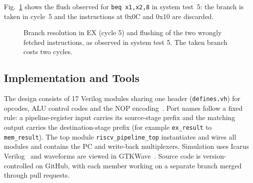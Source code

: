 Fig.~\ref{fig:flush} shows the flush observed for \texttt{beq x1,x2,8} in system test~5:
the branch is taken in cycle~5 and the instructions at 0x0C and 0x10 are discarded.

\begin{figure}[!t]
\centering
{}
\caption{Branch resolution in EX (cycle 5) and flushing of the two wrongly fetched
instructions, as observed in system test 5. The taken branch costs two cycles.}
\label{fig:flush}
\end{figure}

\subsection{Implementation and Tools}
The design consists of 17 Verilog modules sharing one header (\texttt{defines.vh}) for
opcodes, ALU control codes and the NOP encoding~\cite{ieee1364}. Port names follow a
fixed rule: a pipeline-register input carries its source-stage prefix and the matching
output carries the destination-stage prefix (for example \texttt{ex\_result} to
\texttt{mem\_result}). The top module \texttt{riscv\_pipeline\_top} instantiates and wires
all modules and contains the PC and write-back multiplexers. Simulation uses Icarus
Verilog~\cite{iverilog} and waveforms are viewed in GTKWave~\cite{gtkwave}. Source code is
version-controlled on GitHub, with each member working on a separate branch merged through
pull requests.

